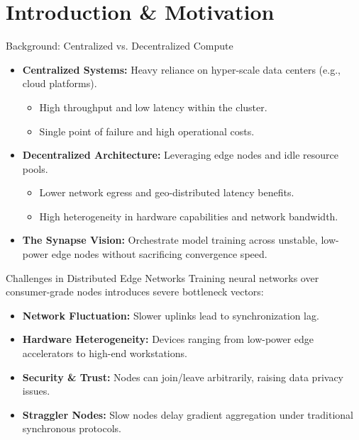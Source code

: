 \section{Introduction \& Motivation}

\begin{frame}{Background: Centralized vs. Decentralized Compute}
  \begin{itemize}
    \item<1-> \textbf{Centralized Systems:} Heavy reliance on hyper-scale data centers (e.g., cloud platforms).
    \begin{itemize}
      \item High throughput and low latency within the cluster.
      \item Single point of failure and high operational costs.
    \end{itemize}
    \item<2-> \textbf{Decentralized Architecture:} Leveraging edge nodes and idle resource pools.
    \begin{itemize}
      \item Lower network egress and geo-distributed latency benefits.
      \item High heterogeneity in hardware capabilities and network bandwidth.
    \end{itemize}
    \item<3-> \textbf{The Synapse Vision:} Orchestrate model training across unstable, low-power edge nodes without sacrificing convergence speed.
  \end{itemize}
\end{frame}

\begin{frame}{Challenges in Distributed Edge Networks}
  Training neural networks over consumer-grade nodes introduces severe bottleneck vectors:
  \vspace{0.3cm}
  \begin{itemize}
    \item \textbf{Network Fluctuation:} Slower uplinks lead to synchronization lag.
    \pause
    \item \textbf{Hardware Heterogeneity:} Devices ranging from low-power edge accelerators to high-end workstations.
    \pause
    \item \textbf{Security \& Trust:} Nodes can join/leave arbitrarily, raising data privacy issues.
    \pause
    \item \textbf{Straggler Nodes:} Slow nodes delay gradient aggregation under traditional synchronous protocols.
  \end{itemize}
\end{frame}
